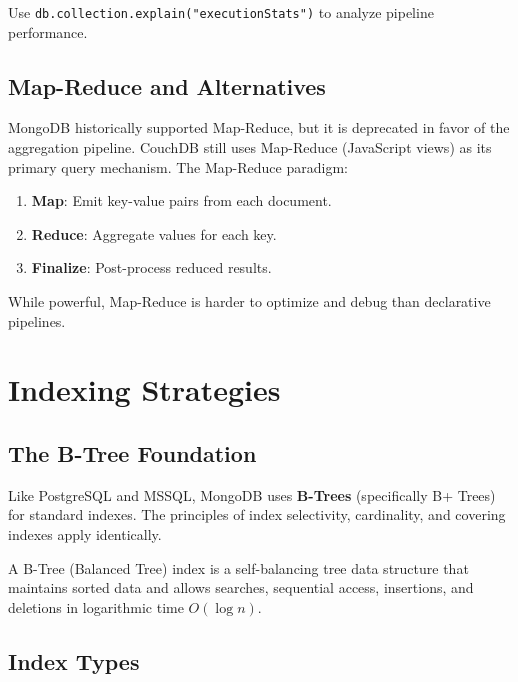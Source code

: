 \documentclass[12pt,a4paper]{article}
\begin{document}
Use \texttt{db.collection.explain("executionStats")} to analyze pipeline performance.

\subsection{Map-Reduce and Alternatives}

MongoDB historically supported Map-Reduce, but it is deprecated in favor of the aggregation pipeline. CouchDB still uses Map-Reduce (JavaScript views) as its primary query mechanism. The Map-Reduce paradigm:

\begin{enumerate}[noitemsep]
    \item \textbf{Map}: Emit key-value pairs from each document.
    \item \textbf{Reduce}: Aggregate values for each key.
    \item \textbf{Finalize}: Post-process reduced results.
\end{enumerate}

While powerful, Map-Reduce is harder to optimize and debug than declarative pipelines.

\section{Indexing Strategies}

\subsection{The B-Tree Foundation}

Like PostgreSQL and MSSQL, MongoDB uses \textbf{B-Trees} (specifically B+ Trees) for standard indexes. The principles of index selectivity, cardinality, and covering indexes apply identically.

\begin{definition}[title=B-Tree Index]
A B-Tree (Balanced Tree) index is a self-balancing tree data structure that maintains sorted data and allows searches, sequential access, insertions, and deletions in logarithmic time $O(\log n)$.
\end{definition}

\subsection{Index Types}
\end{document}
